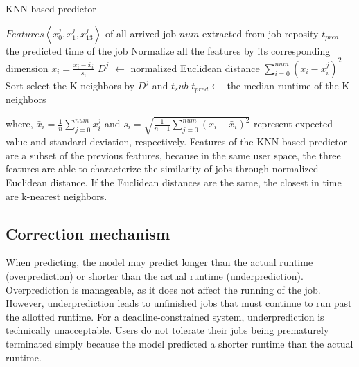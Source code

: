 \documentclass[a4paper,fleqn]{cas-sc}
\begin{document}
\renewcommand{\algorithmicrequire}{\textbf{Input:}}  
\renewcommand{\algorithmicensure}{\textbf{Output:}}  

\begin{algorithm}  
	\caption{KNN-based predictor}  \label{alg1}
	\begin{algorithmic}[1] %
		\Require $Features \left<x_0^j, x_1^j, x_{13}^j\right>$ of all arrived job $num$ extracted from job reposity
		\Ensure $t_{pred}$ the predicted time of the job  
		\State Normalize all the features by its corresponding dimension $x_i=\frac{x_i-\bar{x}_i}{s_i}$ 
		\State $D^j$ $\gets$ normalized Euclidean distance $\sum_{i=0}^{num}\left(x_i-x_i^j\right)^2$ 
		\State Sort select the K neighbors by $D^j$ and $t_sub$   
		\State $t_{pred} \gets $ the median runtime of the K neighbors
		\EndIf  
	\end{algorithmic}  
\end{algorithm}  

where, $\bar{x}_i=\frac{1}{n}\sum_{j=0}^{num}x_i^j$ and $s_i=\sqrt{\frac{1}{n-1}\sum_{j=0}^{num}\left(x_i-\bar{x}_i\right)^2}$ represent expected value and standard deviation, respectively. Features of the KNN-based predictor are a subset of the previous features, because in the same user space, the three features are able to characterize the similarity of jobs through normalized Euclidean distance. If the Euclidean distances are the same, the closest in time are k-nearest neighbors.

\subsection{Correction mechanism}

When predicting, the model may predict longer than the actual runtime (overprediction) or shorter than the actual runtime (underprediction). Overprediction is manageable, as it does not affect the running of the job. However, underprediction leads to unfinished jobs that must continue to run past the allotted runtime. For a deadline-constrained system, underprediction is technically unacceptable. Users do not tolerate their jobs being prematurely terminated simply because the model predicted a shorter runtime than the actual runtime. 
\end{document}
